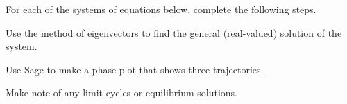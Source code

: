 \documentclass[12pt,twoside]{exam}
\begin{document}
\begin{questions}

    \question For each of the systems of equations below, complete
    the following steps.
    \begin{compactenum}[i.]
        \item Use the method of eigenvectors to find the general 
        (real-valued) solution of the system.
        \item Use Sage to make a phase plot that shows three trajectories.
        \item Make note of any limit cycles or equilibrium solutions.
    \end{compactenum}

\end{questions}
\end{document}
